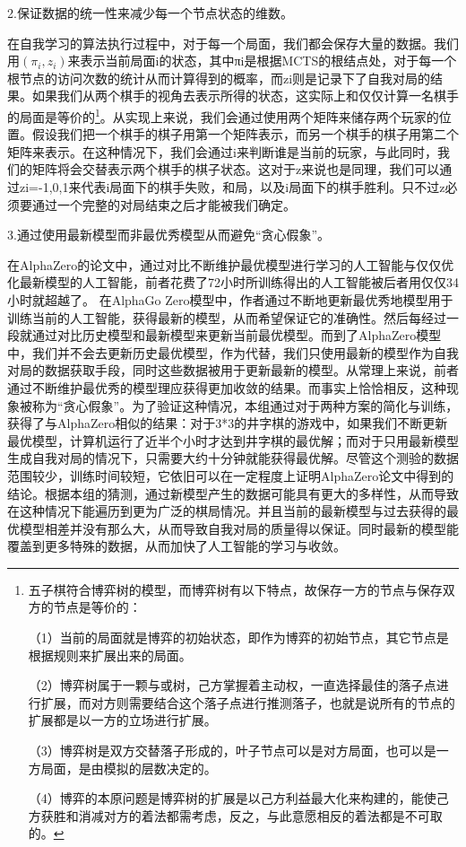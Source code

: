 \documentclass[a4paper]{article}
\begin{document}
\begin{multicols}{2}
2.保证数据的统一性来减少每一个节点状态的维数。\par
在自我学习的算法执行过程中，对于每一个局面，我们都会保存大量的数据。我们用$(\pi_i,z_i)$来表示当前局面i的状态，其中πi是根据MCTS的根结点处，对于每一个根节点的访问次数的统计从而计算得到的概率，而zi则是记录下了自我对局的结果。如果我们从两个棋手的视角去表示所得的状态，这实际上和仅仅计算一名棋手的局面是等价的\footnote{五子棋符合博弈树的模型，而博弈树有以下特点，故保存一方的节点与保存双方的节点是等价的：\par
（1）当前的局面就是博弈的初始状态，即作为博弈的初始节点，其它节点是根据规则来扩展出来的局面。\par
（2）博弈树属于一颗与或树，己方掌握着主动权，一直选择最佳的落子点进行扩展，而对方则需要结合这个落子点进行推测落子，也就是说所有的节点的扩展都是以一方的立场进行扩展。\par
（3）博弈树是双方交替落子形成的，叶子节点可以是对方局面，也可以是一方局面，是由模拟的层数决定的。\par
（4）博弈的本原问题是博弈树的扩展是以己方利益最大化来构建的，能使己方获胜和消减对方的着法都需考虑，反之，与此意愿相反的着法都是不可取的\cite{k9}。\par
}。从实现上来说，我们会通过使用两个矩阵来储存两个玩家的位置。假设我们把一个棋手的棋子用第一个矩阵表示，而另一个棋手的棋子用第二个矩阵来表示。在这种情况下，我们会通过i来判断谁是当前的玩家，与此同时，我们的矩阵将会交替表示两个棋手的棋子状态。这对于z来说也是同理，我们可以通过zi=-1,0,1来代表i局面下的棋手失败，和局，以及i局面下的棋手胜利。只不过z必须要通过一个完整的对局结束之后才能被我们确定。\par
3.通过使用最新模型而非最优秀模型从而避免“贪心假象”。\par
在AlphaZero的论文中，通过对比不断维护最优模型进行学习的人工智能与仅仅优化最新模型的人工智能，前者花费了72小时所训练得出的人工智能被后者用仅仅34小时就超越了。\cite{k10} 在AlphaGo Zero模型中，作者通过不断地更新最优秀地模型用于训练当前的人工智能，获得最新的模型，从而希望保证它的准确性。然后每经过一段就通过对比历史模型和最新模型来更新当前最优模型。而到了AlphaZero模型中，我们并不会去更新历史最优模型，作为代替，我们只使用最新的模型作为自我对局的数据获取手段，同时这些数据被用于更新最新的模型。从常理上来说，前者通过不断维护最优秀的模型理应获得更加收敛的结果。而事实上恰恰相反，这种现象被称为“贪心假象”。为了验证这种情况，本组通过对于两种方案的简化与训练，获得了与AlphaZero相似的结果：对于3*3的井字棋的游戏中，如果我们不断更新最优模型，计算机运行了近半个小时才达到井字棋的最优解；而对于只用最新模型生成自我对局的情况下，只需要大约十分钟就能获得最优解。尽管这个测验的数据范围较少，训练时间较短，它依旧可以在一定程度上证明AlphaZero论文中得到的结论。根据本组的猜测，通过新模型产生的数据可能具有更大的多样性，从而导致在这种情况下能遍历到更为广泛的棋局情况。并且当前的最新模型与过去获得的最优模型相差并没有那么大，从而导致自我对局的质量得以保证。同时最新的模型能覆盖到更多特殊的数据，从而加快了人工智能的学习与收敛。\par

\end{multicols}
\end{document}
